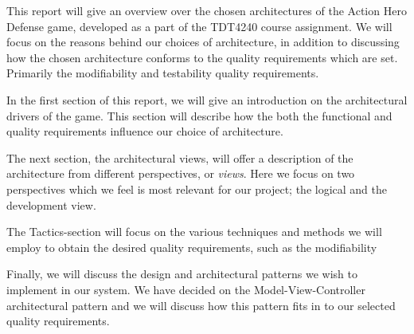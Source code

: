 This report will give an overview over the chosen architectures of the Action Hero Defense game, developed as a part of the TDT4240 course assignment.
We will focus on the reasons behind our choices of architecture, in addition to discussing how the chosen architecture conforms to the quality requirements which are set. Primarily the modifiability and testability quality requirements.

In the first section of this report, we will give an introduction on the architectural drivers of the game. This section will describe how the both the functional and quality requirements influence our choice of architecture. 

The next section, the architectural views, will offer a description of the architecture from different perspectives, or \emph{views}. Here we focus on two perspectives which we feel is most relevant for our project; the logical and the development view.

The Tactics-section will focus on the various techniques and methods we will employ to obtain the desired quality requirements, such as the modifiability 


Finally, we will discuss the design and architectural patterns we wish to implement in our system. We have decided on the Model-View-Controller architectural pattern and we will discuss how this pattern fits in to our selected quality requirements.
